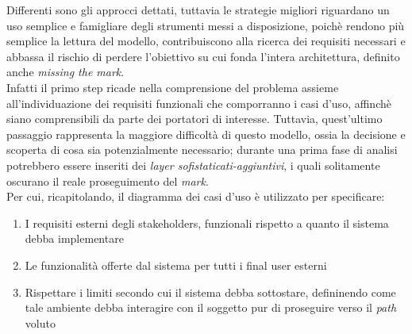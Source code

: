 \documentclass{article}
\begin{document}
Differenti sono gli approcci dettati, tuttavia le strategie migliori riguardano un uso semplice e famigliare degli strumenti messi a disposizione, poichè rendono più semplice la lettura del modello, contribuiscono alla ricerca dei requisiti necessari e abbassa il rischio di perdere l'obiettivo su cui fonda l'intera architettura, definito anche \textit{missing the mark}.\\
Infatti il primo step ricade nella comprensione del problema assieme all'individuazione dei requisiti funzionali che comporranno i casi d'uso, affinchè siano comprensibili da parte dei portatori di interesse. Tuttavia, quest'ultimo passaggio rappresenta la maggiore difficoltà di questo modello, ossia la decisione e scoperta di cosa sia potenzialmente necessario; durante una prima fase di analisi potrebbero essere inseriti dei \textit{layer sofistaticati-aggiuntivi}, i quali solitamente oscurano il reale proseguimento del \textit{mark}.\vspace*{14pt}\\
Per cui, ricapitolando, il diagramma dei casi d'uso è utilizzato per specificare:
\begin{enumerate}
    \renewcommand{\labelenumi}{-}
    \itemsep0em
    \item I requisiti esterni degli stakeholders, funzionali rispetto a quanto il sistema debba implementare
    \item Le funzionalità offerte dal sistema per tutti i final user esterni
    \item Rispettare i limiti secondo cui il sistema debba sottostare, defininendo come tale ambiente debba interagire con il soggetto pur di proseguire verso il \textit{path} voluto
\end{enumerate}
\end{document}
